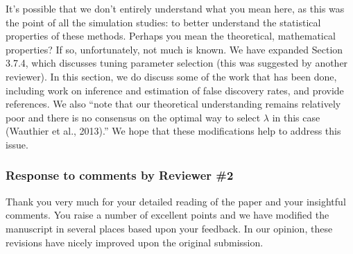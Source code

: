 \documentclass{article}
\begin{document}
\begin{enumerate}
  It's possible that we don't entirely understand what you mean here, as this was the point of all the simulation studies: to better understand the statistical properties of these methods.  Perhaps you mean the theoretical, mathematical properties?  If so, unfortunately, not much is known.  We have expanded Section 3.7.4, which discusses tuning parameter selection (this was suggested by another reviewer).  In this section, we do discuss some of the work that has been done, including work on inference and estimation of false discovery rates, and provide references.  We also ``note that our theoretical understanding remains relatively poor and there is no consensus on
the optimal way to select $\lambda$ in this case (Wauthier et al., 2013).''  We hope that these modifications help to address this issue.

\end{enumerate}

\newpage

\subsubsection*{Response to comments by Reviewer \#2}

Thank you very much for your detailed reading of the paper and your insightful comments. You raise a number of excellent points and we have modified the manuscript in several places based upon your feedback.  In our opinion, these revisions have nicely improved upon the original submission.
\end{document}
